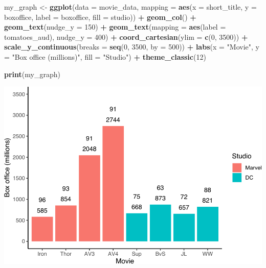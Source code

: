 \documentclass[
]{krantz}
\makeatletter
\newenvironment{Shaded}{\begin{snugshade}}{\end{snugshade}}
\newcommand{\DataTypeTok}[1]{\textcolor[rgb]{0.27,0.27,0.27}{#1}}
\newcommand{\DecValTok}[1]{\textcolor[rgb]{0.06,0.06,0.06}{#1}}
\newcommand{\KeywordTok}[1]{\textcolor[rgb]{0.27,0.27,0.27}{\textbf{#1}}}
\newcommand{\NormalTok}[1]{#1}
\newcommand{\OperatorTok}[1]{\textcolor[rgb]{0.43,0.43,0.43}{\textbf{#1}}}
\newcommand{\StringTok}[1]{\textcolor[rgb]{0.5,0.5,0.5}{#1}}
\newenvironment{kframe}{%
\medskip{}
\setlength{\fboxsep}{.8em}
 \def\at@end@of@kframe{}%
 \ifinner\ifhmode%
  \def\at@end@of@kframe{\end{minipage}}%
  \begin{minipage}{\columnwidth}%
 \fi\fi%
 \def\FrameCommand##1{\hskip\@totalleftmargin \hskip-\fboxsep
 \colorbox{shadecolor}{##1}\hskip-\fboxsep
     \hskip-\linewidth \hskip-\@totalleftmargin \hskip\columnwidth}%
 \MakeFramed {\advance\hsize-\width
   \@totalleftmargin\z@ \linewidth\hsize
   \@setminipage}}%
 {\par\unskip\endMakeFramed%
 \at@end@of@kframe}
\renewenvironment{Shaded}{\begin{kframe}}{\end{kframe}}
\makeatother
\begin{document}
\begin{Shaded}
\begin{Highlighting}[]
\NormalTok{my_graph <-}\StringTok{ }\KeywordTok{ggplot}\NormalTok{(}\DataTypeTok{data =}\NormalTok{ movie_data,}
           \DataTypeTok{mapping =} \KeywordTok{aes}\NormalTok{(}\DataTypeTok{x =}\NormalTok{ short_title,}
                         \DataTypeTok{y =}\NormalTok{ boxoffice,}
                         \DataTypeTok{label =}\NormalTok{ boxoffice, }
                         \DataTypeTok{fill =}\NormalTok{ studio)) }\OperatorTok{+}
\StringTok{  }\KeywordTok{geom_col}\NormalTok{() }\OperatorTok{+}
\StringTok{  }\KeywordTok{geom_text}\NormalTok{(}\DataTypeTok{nudge_y =} \DecValTok{150}\NormalTok{)  }\OperatorTok{+}
\StringTok{  }\KeywordTok{geom_text}\NormalTok{(}\DataTypeTok{mapping =} \KeywordTok{aes}\NormalTok{(}\DataTypeTok{label =}\NormalTok{ tomatoes_aud), }
            \DataTypeTok{nudge_y =} \DecValTok{400}\NormalTok{) }\OperatorTok{+}
\StringTok{  }\KeywordTok{coord_cartesian}\NormalTok{(}\DataTypeTok{ylim =} \KeywordTok{c}\NormalTok{(}\DecValTok{0}\NormalTok{, }\DecValTok{3500}\NormalTok{)) }\OperatorTok{+}
\StringTok{  }\KeywordTok{scale_y_continuous}\NormalTok{(}\DataTypeTok{breaks =} \KeywordTok{seq}\NormalTok{(}\DecValTok{0}\NormalTok{, }\DecValTok{3500}\NormalTok{, }\DataTypeTok{by =} \DecValTok{500}\NormalTok{)) }\OperatorTok{+}
\StringTok{  }\KeywordTok{labs}\NormalTok{(}\DataTypeTok{x =} \StringTok{"Movie"}\NormalTok{,}
       \DataTypeTok{y =} \StringTok{"Box office (millions)"}\NormalTok{,}
       \DataTypeTok{fill =} \StringTok{"Studio"}\NormalTok{) }\OperatorTok{+}
\StringTok{  }\KeywordTok{theme_classic}\NormalTok{(}\DecValTok{12}\NormalTok{)}

\KeywordTok{print}\NormalTok{(my_graph)}
\end{Highlighting}
\end{Shaded}

\includegraphics[width=0.65\linewidth]{bookdown_files/figure-latex/unnamed-chunk-274-1}
\end{document}
